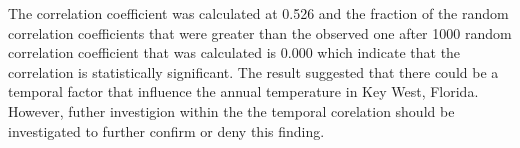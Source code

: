 \documentclass[12pt]{article}
\begin{document}
The correlation coefficient was calculated at 0.526 and the fraction of the random correlation coefficients that were greater than the observed one after 1000 random correlation coefficient that was calculated is 0.000 which indicate that the correlation is statistically significant.
The result suggested that there could be a temporal factor that influence the annual temperature in Key West, Florida.
However, futher investigion within the the temporal corelation should be investigated to further confirm or deny this finding.

    

    
\end{document}
